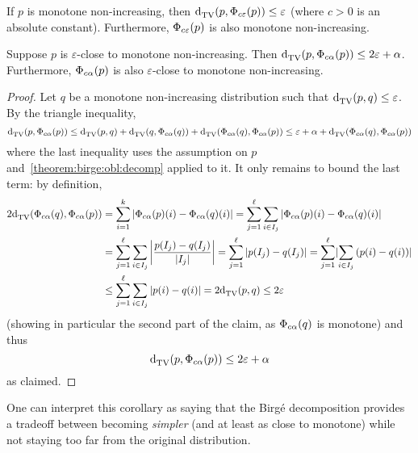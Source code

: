 \documentclass[11pt]{article}
\newcommand{\dst}{\varepsilon}
\newcommand{\ab}{k}
\newcommand{\p}{p}
\newcommand{\q}{q}
\begin{document}
\begin{theorem}\label{theorem:birge:obl:decomp}
 If $\p$ is monotone non-increasing, then $\totalvardist{\p}{\birge[\p]{c\dst}} \leq \dst$ (where $c>0$ is an absolute constant). Furthermore, $\birge[\p]{c\dst}$ is also monotone non-increasing.
\end{theorem}

\begin{corollary}[Robustness]\label{coro:birge:decomposition:robust}
  Suppose $\p$ is $\dst$-close to monotone non-increasing. Then $\totalvardist{\p}{\birge[\p]{c\alpha}} \leq 2\dst+\alpha$. Furthermore,  $\birge[\p]{c\alpha}$ is also $\dst$-close to monotone non-increasing.
\end{corollary}
\begin{proof}
Let $\q$ be a monotone non-increasing distribution such that $\totalvardist{\p}{\q} \leq \dst$. By the triangle inequality,
\[
    \totalvardist{\p}{\birge[\p]{c\alpha}} \leq \totalvardist{\p}{\q} + \totalvardist{\q}{\birge[\q]{c\alpha}} + \totalvardist{\birge[\q]{c\alpha}}{\birge[\p]{c\alpha}}
    \leq \dst + \alpha + \totalvardist{\birge[\q]{c\alpha}}{\birge[\p]{c\alpha}}
\]
where the last inequality uses the assumption on $\p$ and~\autoref{theorem:birge:obl:decomp} applied to it. It only remains to bound the last term: by definition,
\begin{align*}
  2\totalvardist{\birge[\q]{c\alpha}}{\birge[\p]{c\alpha}} 
  &= \sum_{i=1}^\ab \abs{\birge[\p]{c\alpha}(i) - \birge[\q]{c\alpha}(i)} 
  = \sum_{j=1}^\ell\sum_{i\in I_j} \abs{\birge[\p]{c\alpha}(i) - \birge[\q]{c\alpha}(i)} \\
  &= \sum_{j=1}^\ell\sum_{i\in I_j} \abs{ \frac{\p(I_j) - \q(I_j)}{\abs{I_j}} } 
  = \sum_{j=1}^\ell \abs{ \p(I_j) - \q(I_j) } 
  = \sum_{j=1}^\ell \dabs{ \sum_{i\in I_j}\left(  \p(i) - \q(i)  \right)} \\
  &\leq \sum_{j=1}^\ell \sum_{i\in I_j} \abs{ \p(i) - \q(i)} = 2\totalvardist{\p}{\q}
  \leq 2\dst
\end{align*}
(showing in particular the second part of the claim, as $\birge[\q]{c\alpha}$ is monotone) and thus
\[
    \totalvardist{\p}{\birge[\p]{c\alpha}} \leq 2\dst+\alpha
\]
as claimed.
\end{proof}
One can interpret this corollary as saying that the Birg\'e decomposition provides a tradeoff between becoming \emph{simpler} (and at least as close to monotone) while not staying too far from the original distribution.\medskip
\end{document}
